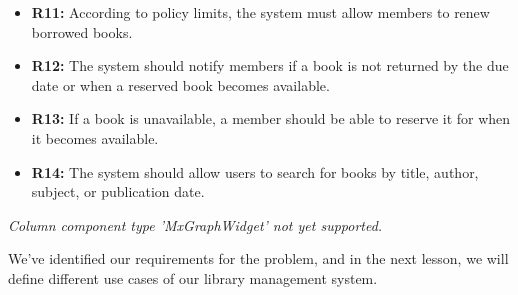 \noindent
\begin{minipage}[t]{0.48\textwidth}\vspace{0pt}
\begin{itemize}
\item
\textbf{R11:} According to policy limits, the system must allow members to renew borrowed books.
\item
\textbf{R12:} The system should notify members if a book is not returned by the due date or when a reserved book becomes available.
\item
\textbf{R13:} If a book is unavailable, a member should be able to reserve it for when it becomes available.
\item
\textbf{R14:} The system should allow users to search for books by title, author, subject, or publication date.
\end{itemize}
\end{minipage}
\hfill
\begin{minipage}[t]{0.48\textwidth}\vspace{0pt}
\textit{Column component type 'MxGraphWidget' not yet supported.}
\end{minipage}

We've identified our requirements for the problem, and in the next lesson, we will define different use cases of our library management system.

